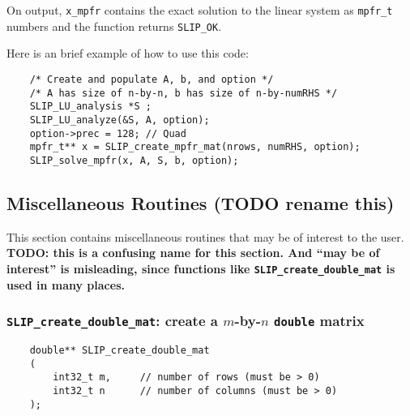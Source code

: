 \documentclass[12pt]{article}
\theoremstyle{definition}
\begin{document}
On output, \verb|x_mpfr| contains the exact solution to the linear system
as \verb|mpfr_t| numbers and the function returns \verb|SLIP_OK|.

Here is an brief example of how to use this code:

{\small
\begin{verbatim}
    /* Create and populate A, b, and option */
    /* A has size of n-by-n, b has size of n-by-numRHS */
    SLIP_LU_analysis *S ;
    SLIP_LU_analyze(&S, A, option);
    option->prec = 128; // Quad
    mpfr_t** x = SLIP_create_mpfr_mat(nrows, numRHS, option);
    SLIP_solve_mpfr(x, A, S, b, option);
\end{verbatim}
}

\subsection{Miscellaneous Routines (TODO rename this)}
\label{s:miscellaneous_routine}

This section contains miscellaneous routines that may be of interest to the
user.
{\bf TODO: this is a confusing name for this section.  And ``may be of
interest'' is misleading, since functions like \verb|SLIP_create_double_mat| is
used in many places.}

\cprotect\subsubsection{\verb|SLIP_create_double_mat|: create a $m$-by-$n$ \verb|double| matrix} \label{ss:create_double_mat}

\begin{mdframed}[userdefinedwidth=6in]
{\footnotesize
\begin{verbatim}
    double** SLIP_create_double_mat
    (
        int32_t m,     // number of rows (must be > 0)
        int32_t n      // number of columns (must be > 0)
    );
\end{verbatim}
} \end{mdframed}
\end{document}
